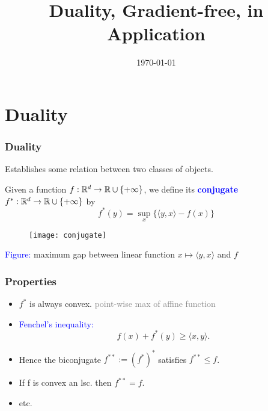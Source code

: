 \documentclass[aspectratio=149]{beamer}
\title{Duality, Gradient-free, in Application}
\date{\today}
\begin{document}
\maketitle
\frame{\tableofcontents}


\section{Duality}%

\begin{frame}
  \frametitle{Duality}
  \begin{center}
    Establishes some relation between two classes of objects.
  \end{center}
  \begin{definition}
    Given a function $f: \mathbb{R}^d \to \mathbb{R} \cup \{+\infty\}$, we define its \textcolor{blue}{\textbf{conjugate}} $f^*:\mathbb{R}^d \to \mathbb{R} \cup\{+\infty\}$ by
    \begin{equation}
      f^*(y) = \sup_x \{\langle y,x \rangle - f(x)\}
    \end{equation}
  \end{definition}
  \begin{minipage}{0.48\textwidth}
  \begin{figure}[ht]
    \centering
    \texttt{[image: conjugate]}
  \end{figure}
  \end{minipage}
  \begin{minipage}{0.48\textwidth}
    \vspace{2cm}
    \textcolor{blue}{Figure:} maximum gap between linear function $x \mapsto \langle y, x \rangle$ and $f$
  \end{minipage}


\end{frame}

\begin{frame}
  \frametitle{Properties}

  \begin{itemize}
    \item $f^*$ is always convex. \hfill{\textcolor{gray}{point-wise max of affine function}}
    \item \textcolor{blue}{Fenchel's inequality:}
          \begin{equation}
            f(x) + f^*(y) \ge \langle x, y \rangle.
          \end{equation}
    \item Hence the biconjugate $f^{**}:={(f^*)}^*$ satisfies $f^{**}\le f$.
    \item If f is convex an lsc. then $f^{**}=f$.
    \item etc.
  \end{itemize}
\end{frame}
\end{document}
